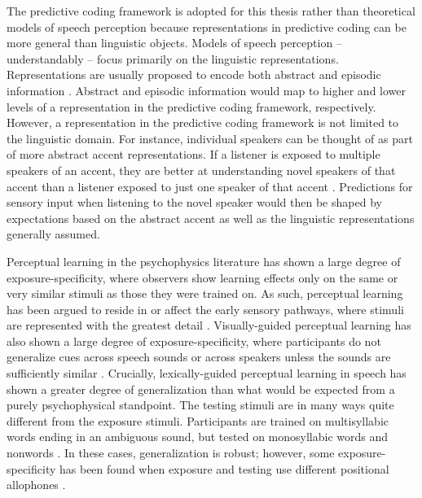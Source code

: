 The predictive coding framework is adopted for this thesis rather than theoretical models of speech perception because representations in predictive coding can be more general than linguistic objects.
Models of speech perception -- understandably -- focus primarily on the linguistic representations.
Representations are usually proposed to encode both abstract and episodic information \citep[e.g.][]{McLennan2003}.
Abstract and episodic information would map to higher and lower levels of a representation in the predictive coding framework, respectively.
However, a representation in the predictive coding framework is not limited to the linguistic domain.
For instance, individual speakers can be thought of as part of more abstract accent representations.
If a listener is exposed to multiple speakers of an accent, they are better at understanding novel speakers of that accent than a listener exposed to just one speaker of that accent \citep{Bradlow2008}.
Predictions for sensory input when listening to the novel speaker would then be shaped by expectations based on the abstract accent as well as the linguistic representations generally assumed.

Perceptual learning in the psychophysics literature has shown a large degree of exposure-specificity, where observers show learning effects only on the same or very similar stimuli as those they were trained on. 
As such, perceptual learning has been argued to reside in or affect the early sensory pathways, where stimuli are represented with the greatest detail \citep{Gilbert2001}.  
Visually-guided perceptual learning has also shown a large degree of exposure-specificity, where participants do not generalize cues across speech sounds \citep{Reinisch2014} or across speakers unless the sounds are sufficiently similar \citep{Eisner2005, Kraljic2005, Kraljic2007, Reinisch2013a}.  
Crucially, lexically-guided perceptual learning in speech has shown a greater degree of generalization than what would be expected from a purely psychophysical standpoint.  
The testing stimuli are in many ways quite different from the exposure stimuli.
Participants are trained on multisyllabic words ending in an ambiguous sound, but tested on monosyllabic words \citep{Reinisch2013} and nonwords \citep{Norris2003, Kraljic2005}. 
In these cases, generalization is robust; however, some exposure-specificity has been found when exposure and testing use different positional allophones \citep{Mitterer2013}.

